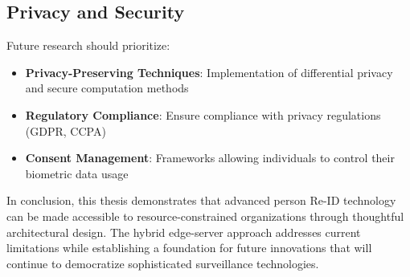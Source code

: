 \documentclass[../main.tex]{subfiles}
\begin{document}
\subsection{Privacy and Security}

Future research should prioritize:

\begin{itemize}
    \item \textbf{Privacy-Preserving Techniques}: Implementation of differential privacy and secure computation methods
    \item \textbf{Regulatory Compliance}: Ensure compliance with privacy regulations (GDPR, CCPA)
    \item \textbf{Consent Management}: Frameworks allowing individuals to control their biometric data usage
\end{itemize}

In conclusion, this thesis demonstrates that advanced person Re-ID technology can be made accessible to resource-constrained organizations through thoughtful architectural design. The hybrid edge-server approach addresses current limitations while establishing a foundation for future innovations that will continue to democratize sophisticated surveillance technologies.
\end{document}
